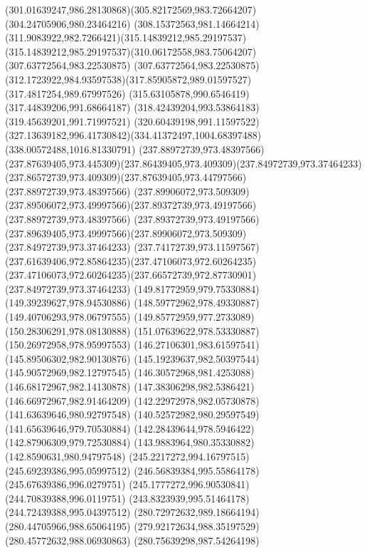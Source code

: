 {{\curveto(301.01639247,986.28130868)(305.82172569,983.72664207)(304.24705906,980.23464216)
\curveto(308.15372563,981.14664214)(311.9083922,982.7266421)(315.14839212,985.29197537)
\curveto(315.14839212,985.29197537)(310.06172558,983.75064207)(307.63772564,983.22530875)
\curveto(307.63772564,983.22530875)(312.1723922,984.93597538)(317.85905872,989.01597527)
\lineto(317.4817254,989.67997526)
\lineto(315.63105878,990.6546419)
\lineto(317.44839206,991.68664187)
\lineto(318.42439204,993.53864183)
\lineto(319.45639201,991.71997521)
\lineto(320.60439198,991.11597522)
\curveto(327.13639182,996.41730842)(334.41372497,1004.68397488)(338.00572488,1016.81330791)
\moveto(237.88972739,973.48397566)
\curveto(237.87639405,973.445309)(237.86439405,973.409309)(237.84972739,973.37464233)
\curveto(237.86572739,973.409309)(237.87639405,973.44797566)(237.88972739,973.48397566)
\moveto(237.89906072,973.509309)
\curveto(237.89506072,973.49997566)(237.89372739,973.49197566)(237.88972739,973.48397566)
\curveto(237.89372739,973.49197566)(237.89639405,973.49997566)(237.89906072,973.509309)
\moveto(237.84972739,973.37464233)
\curveto(237.74172739,973.11597567)(237.61639406,972.85864235)(237.47106073,972.60264235)
\curveto(237.47106073,972.60264235)(237.66572739,972.87730901)(237.84972739,973.37464233)
\moveto(149.81772959,979.75330884)
\lineto(149.39239627,978.94530886)
\lineto(148.59772962,978.49330887)
\lineto(149.40706293,978.06797555)
\lineto(149.85772959,977.2733089)
\lineto(150.28306291,978.08130888)
\lineto(151.07639622,978.53330887)
\lineto(150.26972958,978.95997553)
\closepath
\moveto(146.27106301,983.61597541)
\lineto(145.89506302,982.90130876)
\lineto(145.19239637,982.50397544)
\lineto(145.90572969,982.12797545)
\lineto(146.30572968,981.4253088)
\lineto(146.68172967,982.14130878)
\lineto(147.38306298,982.5386421)
\lineto(146.66972967,982.91464209)
\closepath
\moveto(142.22972978,982.05730878)
\lineto(141.63639646,980.92797548)
\lineto(140.52572982,980.29597549)
\lineto(141.65639646,979.70530884)
\lineto(142.28439644,978.5946422)
\lineto(142.87906309,979.72530884)
\lineto(143.9883964,980.35330882)
\lineto(142.8590631,980.94797548)
\closepath
\moveto(245.2217272,994.16797515)
\lineto(245.69239386,995.05997512)
\lineto(246.56839384,995.55864178)
\lineto(245.67639386,996.0279751)
\lineto(245.1777272,996.90530841)
\lineto(244.70839388,996.0119751)
\lineto(243.8323939,995.51464178)
\lineto(244.72439388,995.04397512)
\closepath
\moveto(280.72972632,989.18664194)
\lineto(280.44705966,988.65064195)
\lineto(279.92172634,988.35197529)
\lineto(280.45772632,988.06930863)
\lineto(280.75639298,987.54264198)
}}
